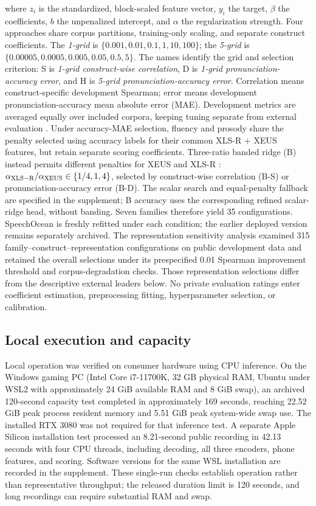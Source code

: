\documentclass[cameraready]{Interspeech}
\begin{document}
where $z_i$ is the standardized, block-scaled feature vector, $y_i$ the target, $\beta$ the coefficients, $b$ the unpenalized intercept, and $\alpha$ the regularization strength. Four approaches share corpus partitions, training-only scaling, and separate construct coefficients. The \emph{1-grid} is $\{0.001,0.01,0.1,1,10,100\}$; the \emph{5-grid} is $\{0.00005,0.0005,0.005,0.05,0.5,5\}$. The names identify the grid and selection criterion: S is \emph{1-grid construct-wise correlation}, D is \emph{1-grid pronunciation-accuracy error}, and H is \emph{5-grid pronunciation-accuracy error}. Correlation means construct-specific development Spearman; error means development pronunciation-accuracy mean absolute error (MAE). Development metrics are averaged equally over included corpora, keeping tuning separate from external evaluation \cite{cawley}. Under accuracy-MAE selection, fluency and prosody share the penalty selected using accuracy labels for their common XLS-R + XEUS features, but retain separate scoring coefficients. Three-ratio banded ridge (B) instead permits different penalties for XEUS and XLS-R \cite{banded}: $\alpha_{\rm XLS-R}/\alpha_{\rm XEUS}\in\{1/4,1,4\}$, selected by construct-wise correlation (B-S) or pronunciation-accuracy error (B-D). The scalar search and equal-penalty fallback are specified in the supplement; B accuracy uses the corresponding refined scalar-ridge head, without banding. Seven families therefore yield 35 configurations. SpeechOcean is freshly refitted under each condition; the earlier deployed version remains separately archived. The representation sensitivity analysis examined 315 family--construct--representation configurations on public development data and retained the overall selections under its prespecified 0.01 Spearman improvement threshold and corpus-degradation checks. Those representation selections differ from the descriptive external leaders below. No private evaluation ratings enter coefficient estimation, preprocessing fitting, hyperparameter selection, or calibration.



\subsection{Local execution and capacity}
Local operation was verified on consumer hardware using CPU inference. On the Windows gaming PC (Intel Core i7-11700K, 32 GB physical RAM, Ubuntu under WSL2 with approximately 24 GiB available RAM and 8 GiB swap), an archived 120-second capacity test completed in approximately 169 seconds, reaching 22.52 GiB peak process resident memory and 5.51 GiB peak system-wide swap use. The installed RTX 3080 was not required for that inference test. A separate Apple Silicon installation test processed an 8.21-second public recording in 42.13 seconds with four CPU threads, including decoding, all three encoders, phone features, and scoring. Software versions for the same WSL installation are recorded in the supplement. These single-run checks establish operation rather than representative throughput; the released duration limit is 120 seconds, and long recordings can require substantial RAM and swap.
\end{document}

